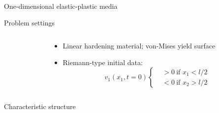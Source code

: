 
\begin{frame}{One-dimensional elastic-plastic media}
  \begin{block}{\footnotesize Problem settings}
    \vspace{-0.2cm}
    \begin{columns}
      \begin{column}{0.49\textwidth}
        \centering
        
      \end{column}
      \begin{column}{0.49\textwidth}
        \begin{footnotesize}
          \begin{itemize}
          \item Linear hardening material; von-Mises yield surface
          \item Riemann-type initial data:
            \begin{equation*}
              v_1(x_1,t=0) \left\lbrace
                \begin{aligned}
                  &>0 \: \text{if } x_1<l/2\\
                  &<0 \: \text{if } x_2>l/2
                \end{aligned}\right.
            \end{equation*}
          \end{itemize}
        \end{footnotesize}
      \end{column}
    \end{columns}
  \end{block}
  \begin{block}{\footnotesize Characteristic structure \cite{Wang}}
    \begin{columns}
      \begin{column}{0.49\textwidth}
\end{column}
\end{columns}
\end{block}
\end{frame}
